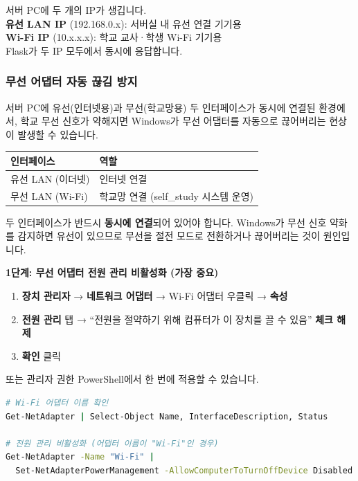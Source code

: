\documentclass[a4paper,12pt]{article}
\newcommand{\menu}[1]{\textcolor{primary}{\textbf{#1}}}
\begin{document}
\begin{tipbox}
  서버 PC에 두 개의 IP가 생깁니다. \\
  \textbf{유선 LAN IP} (192.168.0.x): 서버실 내 유선 연결 기기용 \\
  \textbf{Wi-Fi IP} (10.x.x.x): 학교 교사·학생 Wi-Fi 기기용 \\
  Flask가 두 IP 모두에서 동시에 응답합니다.
\end{tipbox}

\subsubsection{무선 어댑터 자동 끊김 방지}

서버 PC에 유선(인터넷용)과 무선(학교망용) 두 인터페이스가 동시에 연결된 환경에서,
학교 무선 신호가 약해지면 Windows가 무선 어댑터를 자동으로 끊어버리는 현상이 발생할 수 있습니다.

\begin{center}
\begin{tabular}{ll}
\toprule
\textbf{인터페이스} & \textbf{역할} \\
\midrule
유선 LAN (이더넷) & 인터넷 연결 \\
무선 LAN (Wi-Fi) & 학교망 연결 (self\_study 시스템 운영) \\
\bottomrule
\end{tabular}
\end{center}

두 인터페이스가 반드시 \textbf{동시에 연결}되어 있어야 합니다.
Windows가 무선 신호 약화를 감지하면 유선이 있으므로 무선을 절전 모드로 전환하거나
끊어버리는 것이 원인입니다.

\textbf{1단계: 무선 어댑터 전원 관리 비활성화 (가장 중요)}

\begin{enumerate}[leftmargin=1.5em]
  \item \textbf{장치 관리자} → \textbf{네트워크 어댑터} → Wi-Fi 어댑터 우클릭 → \menu{속성}
  \item \textbf{전원 관리} 탭 → ``전원을 절약하기 위해 컴퓨터가 이 장치를 끌 수 있음'' \textbf{체크 해제}
  \item \menu{확인} 클릭
\end{enumerate}

또는 관리자 권한 PowerShell에서 한 번에 적용할 수 있습니다.

\begin{lstlisting}[language=bash]
# Wi-Fi 어댑터 이름 확인
Get-NetAdapter | Select-Object Name, InterfaceDescription, Status

# 전원 관리 비활성화 (어댑터 이름이 "Wi-Fi"인 경우)
Get-NetAdapter -Name "Wi-Fi" |
  Set-NetAdapterPowerManagement -AllowComputerToTurnOffDevice Disabled
\end{lstlisting}
\end{document}
